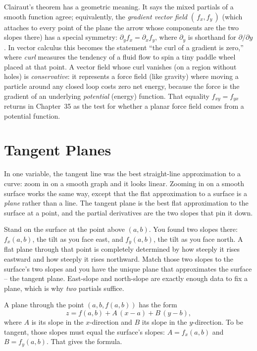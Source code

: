 \begin{connectionbox}
Clairaut's theorem has a geometric meaning. It says the mixed partials of a smooth function
agree; equivalently, the \emph{gradient vector field} $(\,f_x, f_y\,)$ (which attaches to every
point of the plane the arrow whose components are the two slopes there) has a special symmetry:
$\partial_y f_x = \partial_x f_y$, where $\partial_y$ is shorthand for $\partial/\partial y$.
In vector calculus this becomes the statement
``the curl of a gradient is zero,'' where \emph{curl} measures the tendency of a fluid flow to
spin a tiny paddle wheel placed at that point. A vector field whose curl vanishes (on a region
without holes) is \emph{conservative}: it represents a force field (like gravity) where moving a
particle around any closed loop costs zero net energy, because the force is the gradient of an
underlying \emph{potential} (energy) function. That equality $f_{xy}=f_{yx}$ returns in Chapter~35 as the
test for whether a planar force field comes from a potential function.
\end{connectionbox}

\section{Tangent Planes}
\label{ch32:sec-tangent}

In one variable, the tangent line was the best straight-line approximation to a curve: zoom in
on a smooth graph and it looks linear. Zooming in on a smooth surface works the same way, except that the flat
approximation to a surface is a \emph{plane} rather than a line. The tangent plane is the best
flat approximation to the surface at a point, and the partial derivatives are the two
slopes that pin it down.

\begin{intuitionbox}
Stand on the surface at the point above $(a,b)$. You found two slopes there: $f_x(a,b)$, the
tilt as you face east, and $f_y(a,b)$, the tilt as you face north. A flat plane through that
point is completely determined by how steeply it rises eastward and how steeply it rises
northward. Match those two slopes to the surface's two slopes and you have the unique plane that
approximates the surface -- the tangent plane. East-slope and north-slope are exactly enough data to
fix a plane, which is why \emph{two} partials suffice.
\end{intuitionbox}

A plane through the point $(a,b,f(a,b))$ has the form
\[
   z = f(a,b) + A\,(x-a) + B\,(y-b),
\]
where $A$ is its slope in the $x$-direction and $B$ its slope in the $y$-direction. To be
tangent, those slopes must equal the surface's slopes: $A=f_x(a,b)$ and $B=f_y(a,b)$. That
gives the formula.

